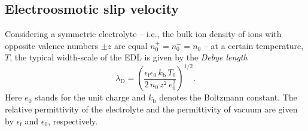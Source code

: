 \subsection{Electroosmotic slip velocity}\label{EOF}
Considering a symmetric electrolyte -- i.e., the bulk ion density of ions with opposite valence numbers $\pm z$ are equal $n^{+}_{0}=n^{-}_{0}=n_{0}$ --  at a certain temperature, $T$, the typical width-scale of the EDL is given by the \textit{Debye length} \cite{KarBes:2001}
\begin{equation}\label{ek:debye}
\lambda_{\mathrm{D}} = \left(\dfrac{\epsilon_{\mathrm{f}}\epsilon_{0}\,k_{\mathrm{b}}\,T_{0}}{2\, n_{0}\, z^{2}\, e^{2}_{0} }\right)^{1/2}.
\end{equation}
Here $e_{0}$ stands for the unit charge and $k_{\mathrm{b}}$ denotes the Boltzmann constant. The relative permittivity of the electrolyte and the permittivity of vacuum are given by $\epsilon_{\mathrm{f}}$ and $\epsilon_{0}$, respectively. 


